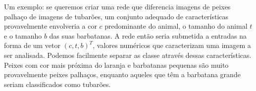 Um exemplo: se queremos criar uma rede que diferencia imagens de peixes palhaço de imagens de tubarões, um conjunto adequado de características provavelmente envolveria a cor $c$ predominante do animal, o tamanho do animal $t$ e o tamanho $b$ das suas barbatanas. A rede então seria submetida a entradas na forma de um vetor $(c, t, b)^T$, valores numéricos que caracterizam uma imagem a ser analisada. Podemos facilmente separar as classe através dessas características. Peixes com cor mais próxima do laranja e barbatanas pequenas são muito provavelmente peixes palhaços, enquanto aqueles que têm a barbatana grande seriam classificados como tubarões.